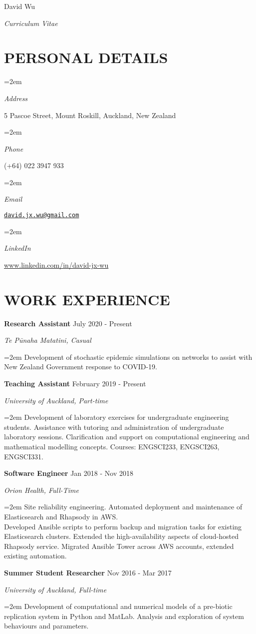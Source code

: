 \documentclass[paper=a4paper,fontsize=11pt]{scrartcl} %
\newlength{\spacebox}
\newcommand{\MyName}[1]{ %
		\Huge \usefont{T1}{phv}{b}{n} \hfill #1
		\par \normalsize \normalfont}
\newcommand{\MySlogan}[1]{ %
		\large \usefont{T1}{phv}{m}{n}\hfill \textit{#1}
		\par \normalsize \normalfont}
\newcommand{\NewPart}[1]{\section*{\uppercase{#1}}}
\newcommand{\PersonalEntry}[2]{
		\noindent\hangindent=2em\hangafter=0 %
		\parbox{\spacebox}{        %
		\textit{#1}}		       %
		\hspace{1.5em} #2 \par}    %
\newcommand{\EducationEntry}[4]{
		\noindent \textbf{#1} \hfill      %
		{#2} \par  %
		\noindent \textit{#3} \par        %
		\noindent\hangindent=2em\hangafter=0 \small #4 %
		\normalsize \par\par}
\newcommand{\WorkEntry}[4]{				  %
		\noindent \textbf{#1} \hfill      %
		{#2} \par  %
		\noindent \textit{#3} \par              %
		\noindent\hangindent=2em\hangafter=0 \small #4 %
		\normalsize \par\par}
\begin{document}
\vspace*{-1cm}
\MyName{David Wu}
\MySlogan{Curriculum Vitae}

\NewPart{Personal Details}

\PersonalEntry{Address}{5 Pascoe Street, Mount Roskill, Auckland, New Zealand}
\PersonalEntry{Phone}{(+64) 022 3947 933}
\PersonalEntry{Email}{\href{mailto:david.jx.wu@gmail.com}{\texttt{david.jx.wu@gmail.com}}}
\PersonalEntry{LinkedIn}{\url{www.linkedin.com/in/david-jx-wu}}

\NewPart{Work experience}

\WorkEntry{Research Assistant}{July 2020 - Present}{Te P\={u}naha Matatini, Casual}{Development of stochastic epidemic simulations on networks to assist with New Zealand Government response to COVID-19.}

\WorkEntry{Teaching Assistant}{February 2019 - Present}{University of Auckland, Part-time}{Development of laboratory exercises for undergraduate engineering students. Assistance with tutoring and administration of undergraduate laboratory sessions. Clarification and support on computational engineering and mathematical modelling concepts. Courses: ENGSCI233, ENGSCI263, ENGSCI331.}

\WorkEntry{Software Engineer}{Jan 2018 - Nov 2018}{Orion Health, Full-Time}{Site reliability engineering. Automated deployment and maintenance of Elasticsearch and Rhapsody in AWS. \\Developed Ansible scripts to perform backup and migration tasks for existing Elasticsearch clusters. Extended the high-availability aspects of cloud-hosted Rhapsody service. Migrated Ansible Tower across AWS accounts, extended existing automation.}


\WorkEntry{Summer Student Researcher}{Nov 2016 - Mar 2017}{University of Auckland, Full-time}{Development of computational and numerical models of a pre-biotic replication system in Python and MatLab. Analysis and exploration of system behaviours and parameters.}
\par
\end{document}
